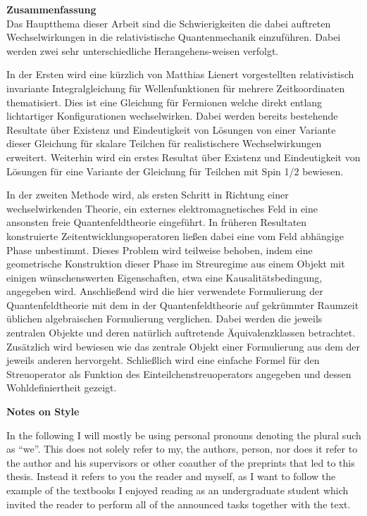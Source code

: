 \documentclass[b5paper,draft,openbib,12pt]{memoir}
\begin{document}
{\large \textbf{Zusammenfassung}}\\

Das Hauptthema dieser Arbeit sind die Schwierigkeiten die 
dabei \linebreak auftreten Wechselwirkungen in die relativistische 
Quantenmechanik einzuführen. Dabei werden zwei sehr unterschiedliche
Herangehens-weisen verfolgt.

In der Ersten wird eine kürzlich von Matthias Lienert vorgestellten 
relativistisch invariante Integralgleichung für Wellenfunktionen 
für \linebreak mehrere Zeitkoordinaten thematisiert. Dies ist eine Gleichung für 
Fermionen welche direkt entlang lichtartiger Konfigurationen 
wechselwirken. Dabei werden bereits bestehende Resultate über 
Existenz und Eindeutigkeit von Lösungen von einer Variante dieser 
Gleichung für skalare Teilchen für realistischere Wechselwirkungen
erweitert. Weiterhin wird ein erstes Resultat über Existenz und 
Eindeutigkeit von Lösungen für eine Variante der Gleichung 
für Teilchen mit Spin 1/2 bewiesen.

In der zweiten Methode wird, als ersten Schritt in 
Richtung einer wechselwirkenden Theorie, ein externes 
elektromagnetisches Feld in eine ansonsten freie Quantenfeldtheorie
eingeführt. In früheren Resultaten konstruierte 
Zeitentwicklungsoperatoren 
ließen dabei eine vom Feld abhängige Phase unbestimmt.
Dieses Problem wird teilweise behoben, indem eine geometrische 
Konstruktion dieser Phase im Streuregime aus einem 
Objekt mit einigen wünschenswerten Eigenschaften, 
etwa eine Kausalitätsbedingung, angegeben wird. 
Anschließend wird die hier verwendete Formulierung der 
Quantenfeldtheorie mit dem in der Quantenfeldtheorie auf 
gekrümmter Raumzeit üblichen algebraischen Formulierung 
verglichen. Dabei werden die jeweils zentralen Objekte
 und deren 
natürlich auftretende Äquivalenzklassen betrachtet.
Zusätzlich wird bewiesen wie das zentrale Objekt einer 
Formulierung aus dem der jeweils anderen hervorgeht. 
Schließlich wird eine einfache Formel für den Streuoperator 
als Funktion des Einteilchenstreuoperators angegeben und
dessen Wohldefiniertheit gezeigt.

\newpage


\begin{center}
  \textbf{Notes on Style}
\end{center}
In the following I will mostly be using personal 
pronouns denoting the plural such as
``we''. This does not solely refer to my, the authors, 
person, nor does it refer to the author and his 
supervisors or other coauther of the preprints that 
led to this thesis. Instead it refers to you the reader 
and myself, as I want to follow 
the example of the textbooks I enjoyed reading as an 
undergraduate student which invited the reader to 
perform all of the announced tasks 
together with the text. 
\end{document}
